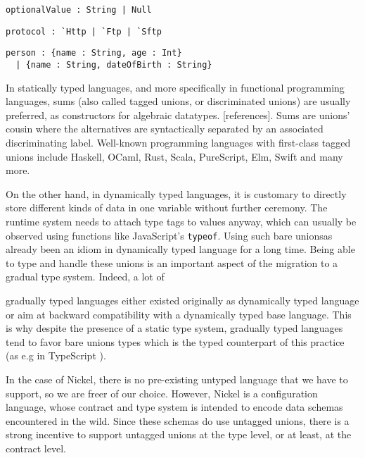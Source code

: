 \documentclass[sigplan,10pt,review,anonymous]{acmart}
\newcommand{\unsure}[2][1=]{}
\newcommand{\resolved}[2]{}
\begin{document}
\label{fig:union-nullable-ex}
\begin{lstlisting}[title={Nullable values}]
optionalValue : String | Null
\end{lstlisting}

\label{fig:union-enum-ex}
\begin{lstlisting}[title={Plain enumeration}]
protocol : `Http | `Ftp | `Sftp
\end{lstlisting}

\label{fig:union-alt-ex}
\begin{lstlisting}[title={Alternative representations}]
person : {name : String, age : Int}
  | {name : String, dateOfBirth : String}
\end{lstlisting}

In statically typed languages, and more specifically in functional programming
languages, sums (also called tagged unions, or discriminated unions) are usually
preferred, as constructors for algebraic datatypes. [references]. Sums are unions' cousin where the alternatives are
syntactically separated by an associated discriminating label. Well-known
programming languages with first-class tagged unions include Haskell, OCaml,
Rust, Scala, PureScript, Elm, Swift and many more.

On the other hand, in dynamically typed languages, it is customary to directly
store different kinds of data in one variable without further ceremony. The
runtime system needs to attach type tags to values anyway, which can usually be
observed using functions like JavaScript's \verb+typeof+. Using such bare
unions\resolved{If you can observe with typeof, then it's pretty much a tagged
union, though the tag is implicit} has already been an idiom in dynamically
typed language for a long time. Being able to type and handle these unions is an
important aspect of the migration to a gradual type system. Indeed, a lot of
\unsure{This is the first time discussing gradual type systems, maybe it should
be introduced earlier, in particular how they relate to contracts 
(I think is mentioned on the appendix)}
gradually typed languages either existed originally as dynamically typed
language or aim at backward compatibility with a dynamically typed base
language. This is why despite the presence of a static type system, gradually
typed languages tend to favor bare unions types which is the typed counterpart
of this practice (as e.g in TypeScript \cite{TypeScriptUnions}).

In the case of Nickel, there is no pre-existing untyped language that we have to
support, so we are freer of our choice. However, Nickel is a configuration
language, whose contract and type system is intended to encode data schemas encountered in the wild. Since these schemas do use
untagged unions, there is a strong incentive to support untagged unions at the
type level, or at least, at the contract level.
\end{document}
